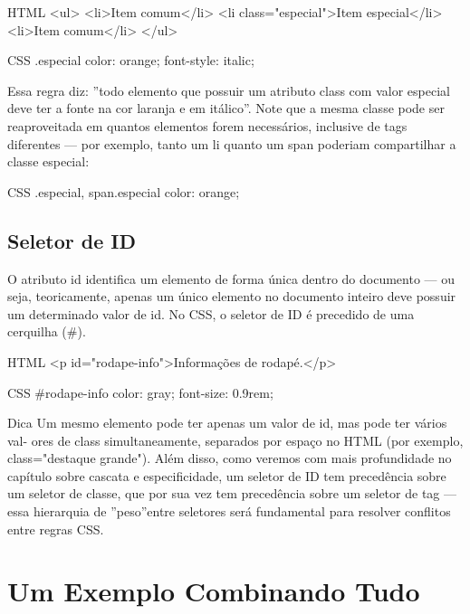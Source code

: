 \begin{codebox}{HTML}
<ul>
  <li>Item comum</li>
  <li class="especial">Item especial</li>
  <li>Item comum</li>
</ul>
\end{codebox}

\begin{codebox}{CSS}
.especial {
  color: orange;
  font-style: italic;
}
\end{codebox}

Essa regra diz: ”todo elemento que possuir um atributo class com valor especial deve ter a fonte na cor laranja e em itálico”. Note que a mesma classe pode ser reaproveitada em quantos elementos forem necessários, inclusive de tags diferentes — por exemplo, tanto um li quanto um span poderiam compartilhar a classe especial:

\begin{codebox}{CSS}
.especial, span.especial {
  color: orange;
}
\end{codebox}

\subsection{Seletor de ID}

O atributo id identifica um elemento de forma única dentro do documento — ou seja, teoricamente, apenas um único elemento no documento inteiro deve possuir um determinado valor de id. No CSS, o seletor de ID é precedido de uma cerquilha (\#).

\begin{codebox}{HTML}
<p id="rodape-info">Informações de rodapé.</p>
\end{codebox}

\begin{codebox}{CSS}
#rodape-info {
  color: gray;
  font-size: 0.9rem;
}
\end{codebox}

\begin{codebox}{Dica}
Um mesmo elemento pode ter apenas um valor de id, mas pode ter vários val-
ores de class simultaneamente, separados por espaço no HTML (por exemplo,
class="destaque grande"). Além disso, como veremos com mais profundidade
no capítulo sobre cascata e especificidade, um seletor de ID tem precedência sobre
um seletor de classe, que por sua vez tem precedência sobre um seletor de tag —
essa hierarquia de ”peso”entre seletores será fundamental para resolver conflitos
entre regras CSS.
\end{codebox}

\section{Um Exemplo Combinando Tudo}

